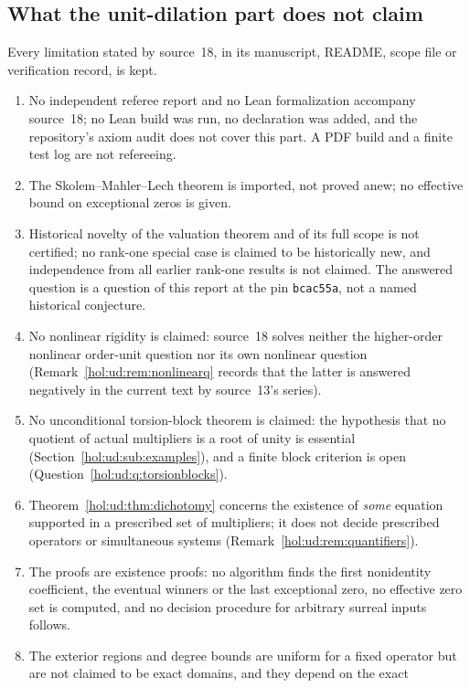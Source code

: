 \documentclass[11pt]{article}
\numberwithin{equation}{section}
\theoremstyle{definition}
\theoremstyle{remark}
\begin{document}
\subsection{What the unit-dilation part does not claim}
\label{hol:ud:sub:nonclaims}

Every limitation stated by source~18, in its manuscript, README, scope file or
verification record, is kept.
\begin{enumerate}[label=\textup{(U\arabic*)}]
\item No independent referee report and no Lean formalization accompany
source~18; no Lean build was run, no declaration was added, and the
repository's axiom audit does not cover this part. A PDF build and a finite
test log are not refereeing.
\item The Skolem--Mahler--Lech theorem is imported, not proved anew; no
effective bound on exceptional zeros is given.
\item Historical novelty of the valuation theorem and of its full scope is not
certified; no rank-one special case is claimed to be historically new, and
independence from all earlier rank-one results is not claimed. The answered
question is a question of this report at the pin \texttt{bcac55a}, not a named
historical conjecture.
\item No nonlinear rigidity is claimed: source~18 solves neither the
higher-order nonlinear order-unit question nor its own nonlinear question
(Remark~\ref{hol:ud:rem:nonlinearq} records that the latter is answered
negatively in the current text by source~13's series).
\item No unconditional torsion-block theorem is claimed: the hypothesis that
no quotient of actual multipliers is a root of unity is essential
(Section~\ref{hol:ud:sub:examples}), and a finite block criterion is open
(Question~\ref{hol:ud:q:torsionblocks}).
\item Theorem~\ref{hol:ud:thm:dichotomy} concerns the existence of \emph{some}
equation supported in a prescribed set of multipliers; it does not decide
prescribed operators or simultaneous systems
(Remark~\ref{hol:ud:rem:quantifiers}).
\item The proofs are existence proofs: no algorithm finds the first
nonidentity coefficient, the eventual winners or the last exceptional zero,
no effective zero set is computed, and no decision procedure for arbitrary
surreal inputs follows.
\item The exterior regions and degree bounds are uniform for a fixed operator
but are not claimed to be exact domains, and they depend on the exact

\end{enumerate}
\end{document}
